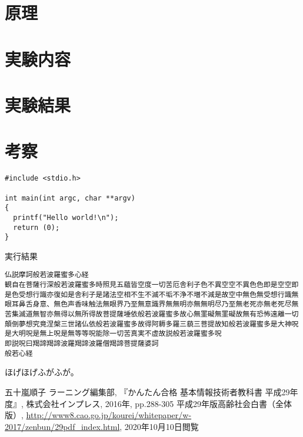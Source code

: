 \documentclass[a4paper]{ltjsarticle}
\begin{document}
\section{原理}
\section{実験内容}
\section{実験結果}
\section{考察}



\begin{lstlisting}[caption=main関数,label=src:main]
#include <stdio.h>

int main(int argc, char **argv)
{
  printf("Hello world!\n");
  return (0);
}
\end{lstlisting}


% 


\begin{result}{実行結果}
\begin{verbatim}
仏説摩訶般若波羅蜜多心経
観自在菩薩行深般若波羅蜜多時照見五蘊皆空度一切苦厄舎利子色不異空空不異色色即是空空即是色受想行識亦復如是舎利子是諸法空相不生不滅不垢不浄不増不減是故空中無色無受想行識無眼耳鼻舌身意、無色声香味触法無眼界乃至無意識界無無明亦無無明尽乃至無老死亦無老死尽無苦集滅道無智亦無得以無所得故菩提薩埵依般若波羅蜜多故心無罣礙無罣礙故無有恐怖遠離一切顛倒夢想究竟涅槃三世諸仏依般若波羅蜜多故得阿耨多羅三藐三菩提故知般若波羅蜜多是大神呪是大明呪是無上呪是無等等呪能除一切苦真実不虚故説般若波羅蜜多呪
即説呪曰羯諦羯諦波羅羯諦波羅僧羯諦菩提薩婆訶
般若心経
\end{verbatim}
\end{result}


ほげほげ\cite{refer1}ふがふが\cite{refer2}。

\begin{thebibliography}{9}
   五十嵐順子 ラーニング編集部, 『かんたん合格 基本情報技術者教科書 平成29年度』, 株式会社インプレス, 2016年, pp.288-305
   平成29年版高齢社会白書（全体版）, \url{http://www8.cao.go.jp/kourei/whitepaper/w-2017/zenbun/29pdf_index.html}, 2020年10月10日閲覧
\end{thebibliography}
\end{document}
